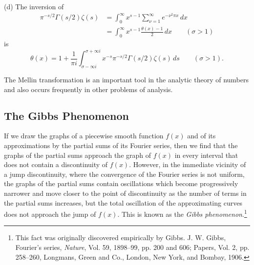 (d) The inversion of
\[
\begin{aligned}
\pi^{-s/2}\Gamma(s/2)\zeta(s)
&=\int_0^\infty x^{s-1}\sum_{\nu=1}^\infty e^{-\nu^2\pi x}\,dx\\
&=\int_0^\infty x^{s-1}\frac{\theta(x)-1}{2}\,dx
\qquad(\sigma>1)
\end{aligned}
\]
is
\[
\theta(x)=1+\frac{1}{\pi i}\int_{\sigma-\infty i}^{\sigma+\infty i}
x^{-s}\pi^{-s/2}\Gamma(s/2)\zeta(s)\,ds
\qquad(\sigma>1).
\]

The Mellin transformation is an important tool in the analytic theory of numbers and also occurs frequently in other problems of analysis.

\subsection{The Gibbs Phenomenon}
If we draw the graphs of a piecewise smooth function $f(x)$ and of its approximations by the partial sums of its Fourier series, then we find that the graphs of the partial sums approach the graph of $f(x)$ in every interval that does not contain a discontinuity of $f(x)$. However, in the immediate vicinity of a jump discontinuity, where the convergence of the Fourier series is not uniform, the graphs of the partial sums contain oscillations which become progressively narrower and move closer to the point of discontinuity as the number of terms in the partial sums increases, but the total oscillation of the approximating curves does not approach the jump of $f(x)$. This is known as the \emph{Gibbs phenomenon}.\footnote{This fact was originally discovered empirically by Gibbs. J. W. Gibbs, Fourier's series, \emph{Nature}, Vol. 59, 1898--99, pp. 200 and 606; Papers, Vol. 2, pp. 258--260, Longmans, Green and Co., London, New York, and Bombay, 1906.}


